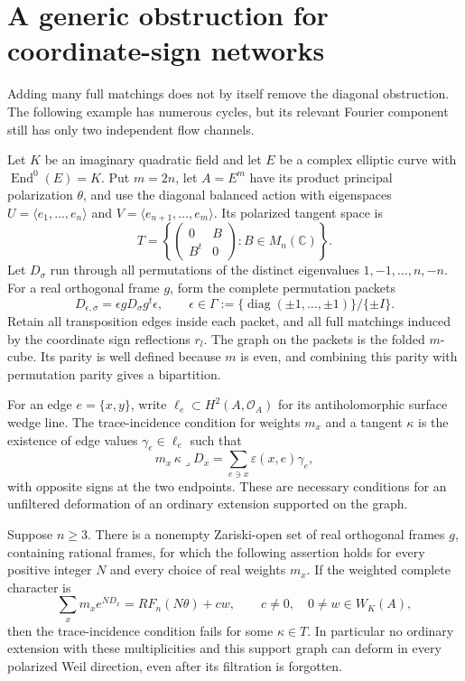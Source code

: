 \section{A generic obstruction for coordinate-sign networks}
\label{sec:sign-cube-obstruction}

Adding many full matchings does not by itself remove the diagonal
obstruction.  The following example has numerous cycles, but its relevant
Fourier component still has only two independent flow channels.

Let \(K\) be an imaginary quadratic field and let \(E\) be a complex
elliptic curve with \(\operatorname{End}^0(E)=K\).
Put \(m=2n\), let \(A=E^{m}\) have its product principal polarization
\(\theta\), and use the diagonal balanced action with eigenspaces
\(U=\langle e_1,\ldots,e_n\rangle\) and
\(V=\langle e_{n+1},\ldots,e_m\rangle\).  Its polarized tangent space is
\[
 T=\left\{\begin{pmatrix}0&B\\B^t&0\end{pmatrix}:B\in M_n(\mathbb C)\right\}.
\]
Let \(D_\sigma\) run through all permutations of the distinct eigenvalues
\(1,-1,\ldots,n,-n\).  For a real orthogonal frame \(g\), form the complete
permutation packets
\[
 D_{\epsilon,\sigma}=\epsilon gD_\sigma g^t\epsilon,
 \qquad
 \epsilon\in\Gamma:=\{\operatorname{diag}(\pm1,\ldots,\pm1)\}/\{\pm I\}.
\]
Retain all transposition edges inside each packet, and all full matchings
induced by the coordinate sign reflections \(r_l\).
The graph on the packets is the folded \(m\)-cube.  Its parity is
well defined because \(m\) is even, and combining this parity with
permutation parity gives a bipartition.

For an edge \(e=\{x,y\}\), write \(\ell_e\subset H^2(A,\mathcal O_A)\)
for its antiholomorphic surface wedge line.  The trace-incidence
condition for weights \(m_x\) and a tangent \(\kappa\) is the existence
of edge values \(\gamma_e\in\ell_e\) such that
\[
 m_x\,\kappa\mathbin{\lrcorner}D_x
   =\sum_{e\ni x}\varepsilon(x,e)\gamma_e,
\]
with opposite signs at the two endpoints.  These are necessary
conditions for an unfiltered deformation of an ordinary extension
supported on the graph.

\begin{theorem}\label{thm:sign-cube-obstruction}
Suppose \(n\ge3\).  There is a nonempty Zariski-open set of real
orthogonal frames \(g\), containing rational frames, for which the
following assertion holds for every positive integer \(N\) and every
choice of real weights \(m_x\).  If the weighted complete character is
\[
 \sum_x m_x e^{ND_x}=R F_n(N\theta)+cw,
 \qquad c\ne0,\quad 0\ne w\in W_K(A),
\]
then the trace-incidence condition fails for some \(\kappa\in T\).
In particular no ordinary extension with these multiplicities and
this support graph can deform in every polarized Weil direction,
even after its filtration is forgotten.
\end{theorem}

